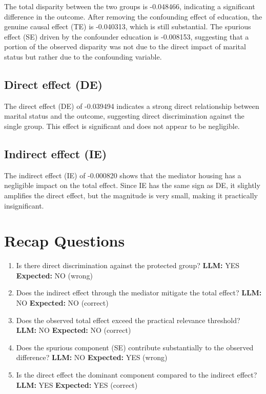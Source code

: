 \documentclass[11pt]{article}
\begin{document}
The total disparity between the two groups is -0.048466, indicating a significant difference in the outcome. After removing the confounding effect of education, the genuine causal effect (TE) is -0.040313, which is still substantial. The spurious effect (SE) driven by the confounder education is -0.008153, suggesting that a portion of the observed disparity was not due to the direct impact of marital status but rather due to the confounding variable.

\subsection{Direct effect (DE)}

The direct effect (DE) of -0.039494 indicates a strong direct relationship between marital status and the outcome, suggesting direct discrimination against the single group. This effect is significant and does not appear to be negligible.

\subsection{Indirect effect (IE)}

The indirect effect (IE) of -0.000820 shows that the mediator housing has a negligible impact on the total effect. Since IE has the same sign as DE, it slightly amplifies the direct effect, but the magnitude is very small, making it practically insignificant.

\section{Recap Questions}

\begin{enumerate}
\item Is there direct discrimination against the protected group? \textbf{LLM:} YES \quad \textbf{Expected:} NO \quad (wrong)
\item Does the indirect effect through the mediator mitigate the total effect? \textbf{LLM:} NO \quad \textbf{Expected:} NO \quad (correct)
\item Does the observed total effect exceed the practical relevance threshold? \textbf{LLM:} NO \quad \textbf{Expected:} NO \quad (correct)
\item Does the spurious component (SE) contribute substantially to the observed difference? \textbf{LLM:} NO \quad \textbf{Expected:} YES \quad (wrong)
\item Is the direct effect the dominant component compared to the indirect effect? \textbf{LLM:} YES \quad \textbf{Expected:} YES \quad (correct)
\end{enumerate}
\end{document}
